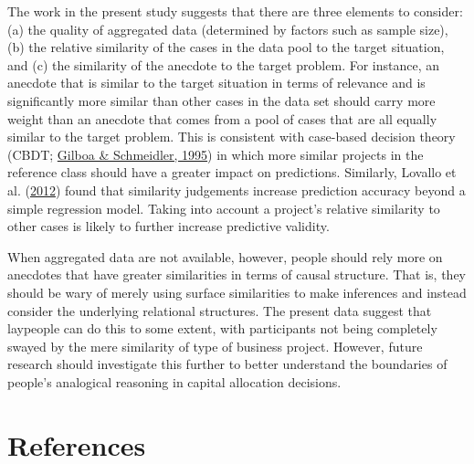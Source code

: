 \documentclass[
  man, donotrepeattitle,floatsintext]{apa7}
\theoremstyle{definition}
\theoremstyle{definition}
\theoremstyle{definition}
\theoremstyle{definition}
\theoremstyle{remark}
\begin{document}
The work in the present study suggests that there are three elements to
consider: (a) the quality of aggregated data (determined by factors such as
sample size), (b) the relative similarity of the cases in the data pool to the
target situation, and (c) the similarity of the anecdote to the target problem.
For instance, an anecdote that is similar to the target situation in terms of
relevance and is significantly more similar than other cases in the data set
should carry more weight than an anecdote that comes from a pool of cases that
are all equally similar to the target problem. This is consistent with
case-based decision theory (CBDT; \protect\hyperlink{ref-gilboa1995}{Gilboa \& Schmeidler, 1995}) in which more similar projects
in the reference class should have a greater impact on predictions. Similarly,
Lovallo et al. (\protect\hyperlink{ref-lovallo2012}{2012}) found that similarity judgements increase prediction accuracy
beyond a simple regression model. Taking into account a project's relative
similarity to other cases is likely to further increase predictive validity.

When aggregated data are not available, however, people should rely more on
anecdotes that have greater similarities in terms of causal structure. That is,
they should be wary of merely using surface similarities to make inferences and
instead consider the underlying relational structures. The present data suggest
that laypeople can do this to some extent, with participants not being
completely swayed by the mere similarity of type of business project. However,
future research should investigate this further to better understand the
boundaries of people's analogical reasoning in capital allocation decisions.

\newpage

\newpage

\hypertarget{references}{%
\section{References}\label{references}}

\begingroup
\setlength{\parindent}{-0.5in}
\setlength{\leftskip}{0.5in}
\end{document}
